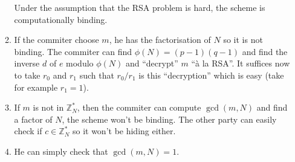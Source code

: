\begin{solution}
\begin{enumerate}
\begin{enumerate}
          Under the assumption that the RSA problem is hard, the scheme is computationally binding.
        \item
          If the commiter choose $m$, he has the factorisation of $N$ so it is not binding.
          The commiter can find $\phi(N)=(p-1)(q-1)$ and find the inverse $d$ of $e$ modulo $\phi(N)$
          and ``decrypt'' $m$ ``à la RSA''.
          It suffices now to take $r_0$ and $r_1$ such that $r_{0}/r_{1}$ is this ``decryption'' which is easy (take for example $r_1 = 1$).
        \item
          If $m$ is not in $\mathbb{Z}_N^*$, then the commiter can compute $\gcd(m, N)$ and find a factor of $N$, the scheme won't be binding.
          The other party can easily check if $c \in \mathbb{Z}_N^*$ so it won't be hiding either.
        \item
          He can simply check that $\gcd(m, N) = 1$.
      \end{enumerate}
  \end{enumerate}
\end{solution}

